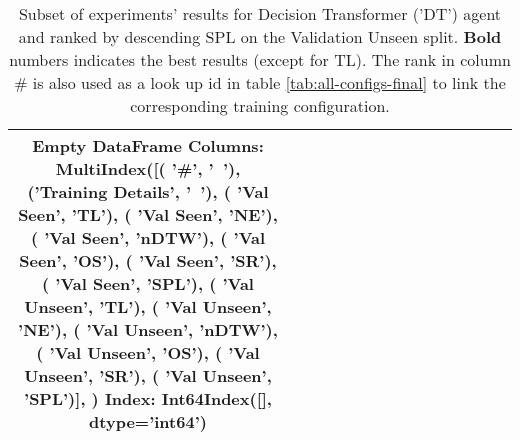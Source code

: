\begin{table}
\centering
\caption{\label{tab:dt_action_for_final_pred}Subset of experiments' results for Decision Transformer ('DT') agent and ranked by descending SPL on the Validation Unseen split. \textbf{Bold} numbers indicates the best results (except for TL). The rank in column \# is also used as a look up id in table \ref{tab:all-configs-final} to link the corresponding training configuration.}
\begin{tabular}{@{\hskip3pt}c@{\hskip3pt}c@{\hskip3pt}c@{\hskip3pt}c@{\hskip3pt}c@{\hskip3pt}c@{\hskip3pt}c@{\hskip3pt}c@{\hskip3pt}c@{\hskip3pt}c@{\hskip3pt}c@{\hskip3pt}c@{\hskip3pt}c@{\hskip3pt}c@{\hskip3pt}c}
\toprule
Empty DataFrame
Columns: MultiIndex([(              '\textbf{\#}',    '\textbf{~}'),
            ('\textbf{Training Details}',    '\textbf{~}'),
            (        '\textbf{Val Seen}',   '\textbf{TL}'),
            (        '\textbf{Val Seen}',   '\textbf{NE}'),
            (        '\textbf{Val Seen}', '\textbf{nDTW}'),
            (        '\textbf{Val Seen}',   '\textbf{OS}'),
            (        '\textbf{Val Seen}',   '\textbf{SR}'),
            (        '\textbf{Val Seen}',  '\textbf{SPL}'),
            (      '\textbf{Val Unseen}',   '\textbf{TL}'),
            (      '\textbf{Val Unseen}',   '\textbf{NE}'),
            (      '\textbf{Val Unseen}', '\textbf{nDTW}'),
            (      '\textbf{Val Unseen}',   '\textbf{OS}'),
            (      '\textbf{Val Unseen}',   '\textbf{SR}'),
            (      '\textbf{Val Unseen}',  '\textbf{SPL}')],
           )
Index: Int64Index([], dtype='int64') \\
\bottomrule
\end{tabular}
\end{table}
